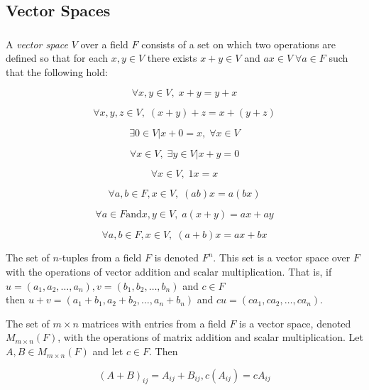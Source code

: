 
\subsection{Vector Spaces}

\subsubsection*{}

\begin{definition}
		A \textit{vector space} \(V\) over a field \(F\) consists of a set on which two operations are defined so that for each \(x,y\in V\) there exists \(x+y\in V\) and \(ax\in V\;\forall a\in F\) such that the following hold:

\[
\forall x, y \in V, \; x + y = y + x
\]

\[
\forall x, y, z \in V, \; (x + y) + z = x + (y + z)
\]

\[
\exists 0 \in V | x + 0 = x, \; \forall x \in V
\]

\[
\forall x \in V, \; \exists y \in V | x + y = 0
\]

\[
\forall x \in V, \; 1x = x
\]

\[
\forall a, b \in F, x \in V, \; (ab)x = a(bx)
\]

\[
\forall a \in F \text{and} x, y \in V, \; a(x + y) = ax + ay
\]

\[
\forall a,b\in F,x\in V,\; (a+b)x = ax+bx
\]

\end{definition}


\begin{example}
		The set of \(n\)-tuples from a field \(F\) is denoted \(F^n\). This set is a vector space over \(F\) with the operations of vector addition and scalar multiplication. That is, if \(u = (a_{1},a_{2},\dots,a_{n}), v = (b_{1},b_{2},\dots,b_{n})\) and \(c\in F\)\\
then \(u + v = (a_{1}+b_{1},a_{2}+b_{2},\dots,a_{n}+b_{n})\) and \(cu = (ca_{1},ca_{2},\dots,ca_{n})\).

\end{example}


\begin{example}
		The set of \(m\times n\) matrices with entries from a field \(F\) is a vector space, denoted \(M_{m\times n}(F)\), with the operations of matrix addition and scalar multiplication. Let \(A,B\in M_{m\times n}(F)\) and let \(c\in F\). Then

\[
(A + B)_{ij} = A_{ij} + B_{ij}, c(A_{ij}) = cA_{ij}
\]

\end{example}


